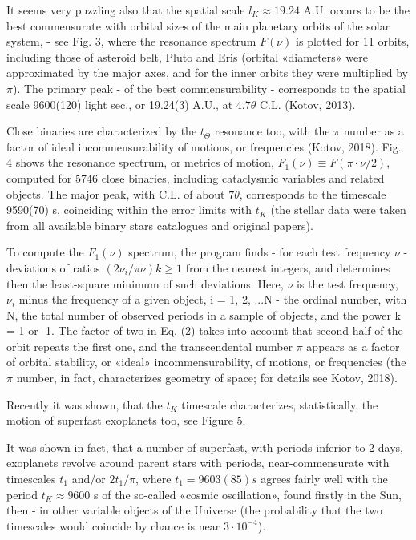 \documentclass[twoside,draft]{article}
\begin{document}
\begin{sloppypar}
It seems very puzzling also that the spatial scale $l_{K} \approx 19.24$ A.U. occurs to be the best commensurate with orbital sizes of the main planetary orbits of the solar system, - see Fig. 3, where the resonance spectrum $F( \nu )$ is plotted for 11 orbits, including those of asteroid belt, Pluto and Eris (orbital «diameters» were approximated by the major axes, and for the inner orbits they were multiplied by $\pi$). The primary peak - of the best commensurability - corresponds to the spatial scale 9600(120) light sec., or 19.24(3) A.U., at $4.7 \theta$ C.L. (Kotov, 2013).

Close binaries are characterized by the $t_{\Theta}$ resonance too, with the $\pi$ number as a factor of ideal incommensurability of motions, or frequencies (Kotov, 2018). Fig. 4 shows the resonance spectrum, or metrics of motion, $F_{1} (\nu) \equiv F(\pi \cdot \nu/2)$, computed for 5746 close binaries, including cataclysmic variables and related objects. The major peak, with C.L. of about $7 \theta$, corresponds to the timescale 9590(70) s, coinciding within the error limits with $t_{K}$ (the stellar data were taken from all available binary stars catalogues and original papers).

To compute the $F_{1} (\nu)$ spectrum, the program finds - for each test frequency $\nu$ - deviations of ratios $(2\nu_{i} /\pi \nu) k \geq 1$ from the nearest integers, and determines then the least-square minimum of such deviations. Here, $\nu$ is the test frequency, $\nu_{i}$ minus the frequency of a given object, i = 1, 2, ...N - the ordinal number, with N, the total number of observed periods in a sample of objects, and the power k = 1 or -1. The factor of two in Eq. (2) takes into account that second half of the orbit repeats the first one, and the transcendental number $\pi$ appears as a factor of orbital stability, or «ideal» incommensurability, of motions, or frequencies (the $\pi$ number, in fact, characterizes geometry of space; for details see Kotov, 2018).

Recently it was shown, that the $t_K$ timescale characterizes, statistically, the motion of superfast exoplanets too, see Figure 5.

It was shown in fact, that a number of superfast, with periods inferior to 2 days, exoplanets revolve around parent stars with periods, near-commensurate with timescales $t_{1}$ and/or $2 t_{1}/\pi$, where $t_{1} = 9603(85) s$ agrees fairly well with the period $t_{K} \approx 9600$ s of the so-called «cosmic oscillation», found firstly in the Sun, then - in other variable objects of the Universe (the probability that the two timescales would coincide by chance is near $3 \cdot 10^{-4}$).


\end{sloppypar}
\end{document}
